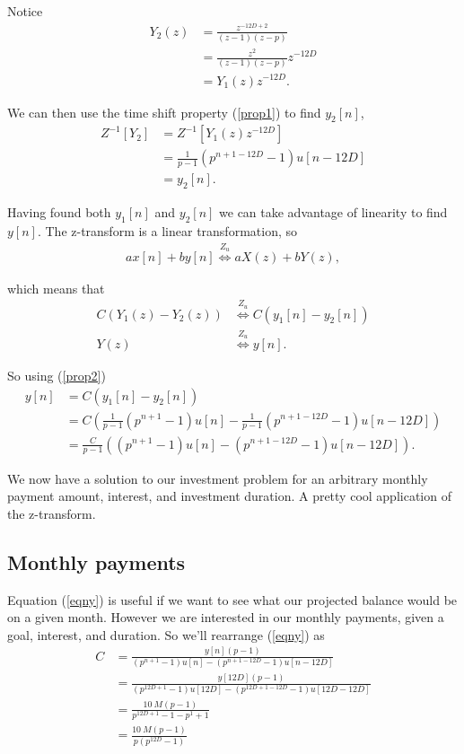 \documentclass[letterpaper]{article}
\begin{document}
Notice 
\begin{align}
	Y_2(z) &= \frac{z^{-12D+2}}{(z-1)(z - p)} \\
	       &= \frac{z^{2}}{(z-1)(z - p)}z^{-12D} \\
	       &= Y_1(z) z^{-12D}.
\end{align}

We can then use the time shift property (\ref{prop1}) to find $y_2[n]$,
\begin{align}
	Z^{-1}\left[Y_2\right] &= Z^{-1}\left[Y_1(z) z^{-12D}\right] \\
						   &= \frac{1}{p - 1}\left(p^{n+1-12D} - 1 \right)u[n-12D] \\
						   &= y_2[n].
\end{align}

Having found both $y_1[n]$ and $y_2[n]$ we can take advantage of linearity to find $y[n]$. The z-transform is a linear transformation, so 
\begin{align}
	ax[n] + by[n] \stackrel{Z_u}{\Longleftrightarrow} aX(z) + bY(z), \label{prop2}
\end{align}

which means that 
\begin{align}
	C \left(Y_1(z) - Y_2(z) \right) &\stackrel{Z_u}{\Longleftrightarrow} C \left(y_1[n] - y_2[n] \right) \\
	Y(z) &\stackrel{Z_u}{\Longleftrightarrow} y[n].
\end{align}

So using (\ref{prop2})
\begin{align}
	y[n] &= C(y_1[n] - y_2[n]) \\
		 &= C \left(\frac{1}{p - 1}\left(p^{n+1} - 1 \right)u[n] - \frac{1}{p - 1}\left(p^{n+1-12D} - 1 \right)u[n-12D] \right) \\
		 &= \frac{C}{p - 1}\left(\left(p^{n+1} - 1 \right)u[n] - \left(p^{n+1-12D} - 1 \right)u[n-12D] \right). \label{eqny}
\end{align}

We now have a solution to our investment problem for an arbitrary monthly payment amount, interest, and investment duration. A pretty cool application of the z-transform. 

\subsection{Monthly payments}
Equation (\ref{eqny}) is useful if we want to see what our projected balance would be on a given month. However we are interested in our monthly payments, given a goal, interest, and duration. So we'll rearrange (\ref{eqny}) as
\begin{align}
	C &= \frac{y[n](p - 1)}{\left(p^{n+1} - 1 \right)u[n] - \left(p^{n+1-12D} - 1 			\right)u[n-12D]} \\
	  &= \frac{y[12D](p - 1)}{\left(p^{12D+1} - 1 \right)u[12D] - \left(p^{12D+1-12D} - 1 \right)u[12D-12D]} \\
	  &= \frac{\SI{10}{M}(p - 1)}{p^{12D+1} - 1 - p^1 + 1} \\
	  &= \frac{\SI{10}{M}(p - 1)}{p\left(p^{12D} - 1\right)}
\end{align}
\end{document}
